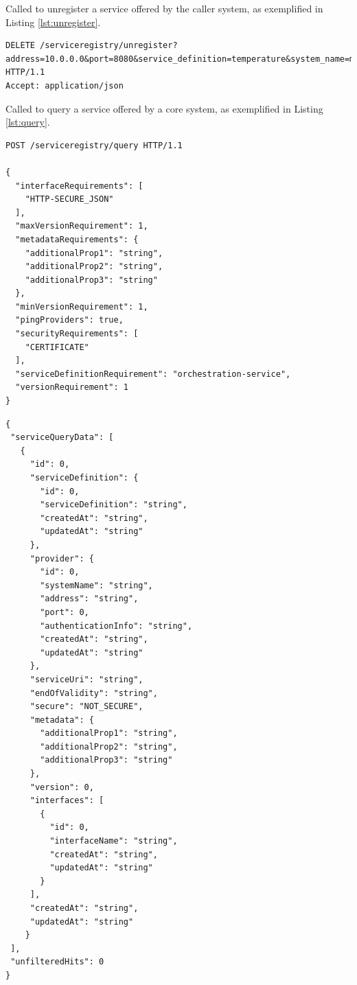 \documentclass[a4paper]{arrowhead}
\newcommand{\fref}[1]{{\textcolor{ArrowheadBlue}{\hyperref[sec:functions:#1]{#1}}}}
\newcommand{\pref}[1]{{\textcolor{ArrowheadGrey}{\hyperref[sec:model:primitives:#1]{#1}}}}
\begin{document}
Called to unregister a service offered by the caller system, as exemplified in Listing \ref{lst:unregister}.

\begin{lstlisting}[language=http,label={lst:unregister},caption={An \fref{Unregister} invocation.}]
DELETE /serviceregistry/unregister?address=10.0.0.0&port=8080&service_definition=temperature&system_name=mytemperaturesensor HTTP/1.1
Accept: application/json
\end{lstlisting}


Called to query a service offered by a core system, as exemplified in Listing \ref{lst:query}.

\begin{lstlisting}[language=http,label={lst:query},caption={A \fref{Query} invocation.}]
POST /serviceregistry/query HTTP/1.1

{
  "interfaceRequirements": [
    "HTTP-SECURE_JSON"
  ],
  "maxVersionRequirement": 1,
  "metadataRequirements": {
    "additionalProp1": "string",
    "additionalProp2": "string",
    "additionalProp3": "string"
  },
  "minVersionRequirement": 1,
  "pingProviders": true,
  "securityRequirements": [
    "CERTIFICATE"
  ],
  "serviceDefinitionRequirement": "orchestration-service",
  "versionRequirement": 1
}

\end{lstlisting}

\begin{lstlisting}[language=http,label={lst:query_response},caption={A \fref{Query} response. Every \pref{Object} contains an id.}]
{
 "serviceQueryData": [
   {
     "id": 0,
     "serviceDefinition": {
       "id": 0,
       "serviceDefinition": "string",
       "createdAt": "string",
       "updatedAt": "string"
     },
     "provider": {
       "id": 0,
       "systemName": "string",
       "address": "string",
       "port": 0,
       "authenticationInfo": "string",
       "createdAt": "string",
       "updatedAt": "string"
     },
     "serviceUri": "string",
     "endOfValidity": "string",
     "secure": "NOT_SECURE",
     "metadata": {
       "additionalProp1": "string",
       "additionalProp2": "string",
       "additionalProp3": "string"
     },
     "version": 0,
     "interfaces": [
       {
         "id": 0,
         "interfaceName": "string",
         "createdAt": "string",
         "updatedAt": "string"
       }
     ],
     "createdAt": "string",
     "updatedAt": "string"
    }
 ],
 "unfilteredHits": 0
}
\end{lstlisting}
\end{document}
